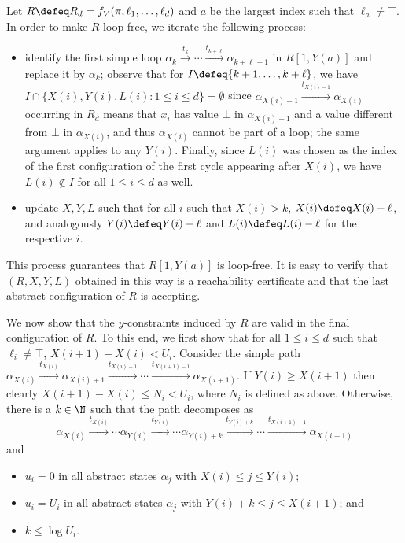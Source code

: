Let $R \defeq R_d = f_V(\pi,\ell_1,\ldots,\ell_{d})$ and $a$ be the
largest index such that $\ell_a\neq \top$. In order to make $R$
loop-free, we iterate the following process:
%
\begin{itemize}
\item identify the first simple loop $\alpha_k \xrightarrow{t_k} \cdots \xrightarrow{t_{k+\ell}}
  \alpha_{k+\ell+1}$ in $R[1,Y(a)]$ and replace it by $\alpha_k$;
  observe that for $I \defeq \{k+1,\ldots,k+\ell\}$, we have $I \cap
  \{ X(i), Y(i), L(i) : 1\le i \le d \} = \emptyset$ since
  $\alpha_{X(i)-1} \xrightarrow{t_{X(i)-1}} \alpha_{X(i)}$ occurring in $R_d$ means
  that $x_i$ has value $\bot$ in $\alpha_{X(i)-1}$ and a value different from $\bot$ in
  $\alpha_{X(i)}$, and thus $\alpha_{X(i)}$ cannot be part of a
  loop; the same argument applies to any $Y(i)$. Finally, since $L(i)$
  was chosen as the index of the first configuration of the first
  cycle appearing after $X(i)$, we have $L(i)\not\in I$ for all $1\le
  i\le d$ as well.
\item update $X,Y,L$ such that for all $i$ such that $X(i)>k$,
  $X(i)\defeq X(i)-\ell$, and analogously $Y(i) \defeq Y(i) - \ell$
  and $L(i) \defeq L(i) - \ell$ for the respective $i$.
\end{itemize}
%
This process guarantees that $R[1,Y(a)]$ is loop-free. It is easy
to verify that $(R,X,Y,L)$ obtained in this way is a reachability
certificate and that the last abstract configuration of $R$ is
accepting.

We now show that the $y$-constraints induced by $R$ are valid in the
final configuration of $R$. To this end, we first show that for all
$1\le i\le d$ such that $\ell_i\neq\top$, $X(i+1) - X(i) <
U_i$. Consider the simple path $\alpha_{X(i)}
\xrightarrow{t_{X(i)}} \alpha_{X(i)+1} \xrightarrow{t_{X(i)+1}} \cdots \xrightarrow{t_{X(i+1)-1}}
\alpha_{X(i+1)}$. If $Y(i) \ge X(i+1)$ then clearly $X(i+1)-X(i) \le
N_i<U_i$, where $N_i$ is defined as above. Otherwise, there is a
$k\in\N$ such that the path decomposes as
\[
\alpha_{X(i)} \xrightarrow{t_{X(i)}}\cdots \alpha_{Y(i)}\xrightarrow{t_{Y(i)}}\cdots 
\alpha_{Y(i)+k}\xrightarrow{t_{Y(i)+k}}\cdots \xrightarrow{t_{X(i+1)-1}}\alpha_{X(i+1)}
\]
and
\begin{itemize}
\item $u_i=0$ in all abstract states $\alpha_j$ with $X(i)\le j\le
  Y(i)$;
\item $u_i=U_i$ in all abstract states $\alpha_j$ with $Y(i)+k\le j\le
  X(i+1)$; and
\item $k\le \log{U_i}$.
\end{itemize}

